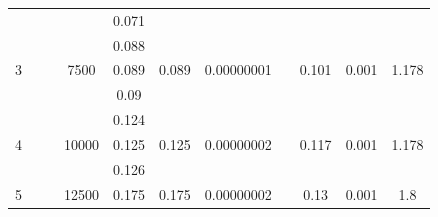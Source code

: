 \documentclass[a4paper,12pt]{article}
\begin{document}
\begin{table}[h!]
\begin{tabular}{|c|c|c|c|c|c|c|c|c|c|c|}
			&                        &                                                          &                        & 0.071  &                        &                             &                                 &                        &                        &                        \\ \cline{1-1} \cline{4-7} \cline{9-11} 
			\multirow{3}{*}{3} &                        &                                                          & \multirow{3}{*}{7500}  & 0.088  & \multirow{3}{*}{0.089} & \multirow{3}{*}{0.00000001} &                                 & \multirow{3}{*}{0.101} & \multirow{3}{*}{0.001} & \multirow{3}{*}{1.178} \\ \cline{5-5}
			&                        &                                                          &                        & 0.089  &                        &                             &                                 &                        &                        &                        \\ \cline{5-5}
			&                        &                                                          &                        & 0.09   &                        &                             &                                 &                        &                        &                        \\ \cline{1-1} \cline{4-7} \cline{9-11} 
			\multirow{3}{*}{4} &                        &                                                          & \multirow{3}{*}{10000} & 0.124  & \multirow{3}{*}{0.125} & \multirow{3}{*}{0.00000002} &                                 & \multirow{3}{*}{0.117} & \multirow{3}{*}{0.001} & \multirow{3}{*}{1.178} \\ \cline{5-5}
			&                        &                                                          &                        & 0.125  &                        &                             &                                 &                        &                        &                        \\ \cline{5-5}
			&                        &                                                          &                        & 0.126  &                        &                             &                                 &                        &                        &                        \\ \cline{1-1} \cline{4-7} \cline{9-11} 
			\multirow{3}{*}{5} &                        &                                                          & \multirow{3}{*}{12500} & 0.175  & \multirow{3}{*}{0.175} & \multirow{3}{*}{0.00000002} &                                 & \multirow{3}{*}{0.13}  & \multirow{3}{*}{0.001} & \multirow{3}{*}{1.8}   \\ \cline{5-5}

\end{tabular}
\end{table}
\end{document}
